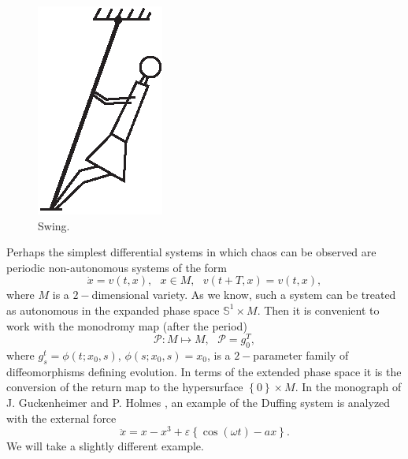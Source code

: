 \begin{figure}[!ht]
	\centering
	\includegraphics [scale=1.5]{jtr52}
	\caption{Swing.}
	\label{fig:5.2}
\end{figure}

Perhaps the simplest differential systems in which chaos can be observed are periodic non-autonomous systems of the form
\begin{equation}
\label{5.1}
\dot{x}=v(t,x),\text{ \ \ }x\in M,\text{ \ \ }v(t+T,x)=v(t,x),
\end{equation}
where $M$ is a $2-$dimensional variety. As we know, such a system can be treated as autonomous in the expanded phase space $\mathbb{S}^{1}\times M$. Then it is convenient to work with the monodromy map (after the period)
$$
\mathcal{P}:M\longmapsto M,\text{ \ \ \ } \mathcal{P}=g_{0}^{T},
$$
where $g_{s}^{t} = \phi(t; x_0, s)$, $\phi(s;x_0, s) = x_0$, is a $2-$parameter family of diffeomorphisms defining evolution. In terms of the extended phase space it is the conversion of the return map to the hypersurface $\left\{0\right\} \times M$. In the monograph of J. Guckenheimer and P. Holmes \cite{GuHo}, an example of the Duffing system is analyzed with the external force
$$
\ddot{x}=x-x^{3}+\varepsilon \left\{ \cos (\omega t)-ax\right\} .
$$
We will take a slightly different example.

